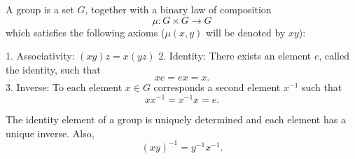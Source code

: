 A group is a set $G$, together with a binary law of composition
$$\mu: G \times G \to G$$
which satisfies the following axioms ($\mu(x, y)$ will be denoted by $xy$):

1. Associativity: $(xy)z = x(yz)$
2. Identity: There exists an element $e$, called the identity, such that
$$xe = ex = x.$$
3. Inverse: To each element $x \in G$ corresponds a second element $x^{-1}$ such that
$$xx^{-1} = x^{-1}x = e.$$

The identity element of a group is uniquely determined and each element has a unique inverse. Also,
$$(xy)^{-1} = y^{-1}x^{-1}.$$
